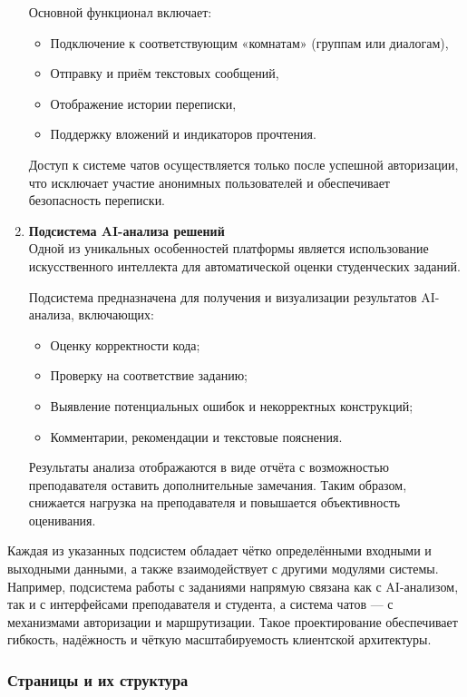 \begin{enumerate}
  Основной функционал включает:
  \begin{itemize}
    \item Подключение к соответствующим «комнатам» (группам или диалогам),
    \item Отправку и приём текстовых сообщений,
    \item Отображение истории переписки,
    \item Поддержку вложений и индикаторов прочтения.
  \end{itemize}
  
  Доступ к системе чатов осуществляется только после успешной авторизации, что исключает участие анонимных пользователей и обеспечивает безопасность переписки.

  \item \textbf{Подсистема AI-анализа решений}\\
  Одной из уникальных особенностей платформы является использование искусственного интеллекта для автоматической оценки студенческих заданий.
  
  Подсистема предназначена для получения и визуализации результатов AI-анализа, включающих:
  \begin{itemize}
    \item Оценку корректности кода;
    \item Проверку на соответствие заданию;
    \item Выявление потенциальных ошибок и некорректных конструкций;
    \item Комментарии, рекомендации и текстовые пояснения.
  \end{itemize}
  
  Результаты анализа отображаются в виде отчёта с возможностью преподавателя оставить дополнительные замечания. Таким образом, снижается нагрузка на преподавателя и повышается объективность оценивания.

\end{enumerate}

Каждая из указанных подсистем обладает чётко определёнными входными и выходными данными, а также взаимодействует с другими модулями системы. Например, подсистема работы с заданиями напрямую связана как с AI-анализом, так и с интерфейсами преподавателя и студента, а система чатов — с механизмами авторизации и маршрутизации. Такое проектирование обеспечивает гибкость, надёжность и чёткую масштабируемость клиентской архитектуры.

\subsubsection{Страницы и их структура}

